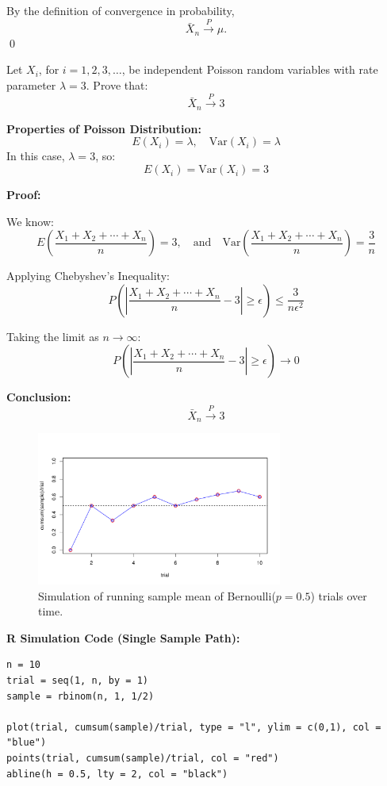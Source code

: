 By the definition of convergence in probability,
\[
\bar{X}_n \xrightarrow{P} \mu.
\]
\qed
\begin{example}

Let \( X_i \), for \( i = 1, 2, 3, \ldots \), be independent Poisson random variables with rate parameter \( \lambda = 3 \). Prove that:
\[
\bar{X}_n \xrightarrow{P} 3
\]

\textbf{Properties of Poisson Distribution:}
\[
E(X_i) = \lambda, \quad \mathrm{Var}(X_i) = \lambda
\]
In this case, \( \lambda = 3 \), so:
\[
E(X_i) = \mathrm{Var}(X_i) = 3
\]

\textbf{Proof:}

We know:
\[
E\left( \frac{X_1 + X_2 + \cdots + X_n}{n} \right) = 3, \quad \text{and} \quad
\mathrm{Var}\left( \frac{X_1 + X_2 + \cdots + X_n}{n} \right) = \frac{3}{n}
\]

Applying Chebyshev’s Inequality:
\[
P\left( \left| \frac{X_1 + X_2 + \cdots + X_n}{n} - 3 \right| \geq \epsilon \right) \leq \frac{3}{n \epsilon^2}
\]

Taking the limit as \( n \to \infty \):
\[
P\left( \left| \frac{X_1 + X_2 + \cdots + X_n}{n} - 3 \right| \geq \epsilon \right) \to 0
\]

\textbf{Conclusion:}
\[
\bar{X}_n \xrightarrow{P} 3
\]
\end{example}
\begin{figure}[H]
  \centering
  \includegraphics[width=0.72\textwidth]{Section5/images/simulation_plot.pdf}
  \caption{Simulation of running sample mean of Bernoulli(\(p = 0.5\)) trials over time.}
\end{figure}

\noindent\textbf{R Simulation Code (Single Sample Path):}
\begin{tcolorbox}[
    colback=gray!10,
    colframe=black!45,
    arc=2mm,
    enhanced,
    breakable,
    width=\textwidth,
    boxsep=0pt,
    left=4pt,    %
    right=8pt,   %
    top=2pt,
    bottom=2pt
]
\begin{verbatim}
n = 10
trial = seq(1, n, by = 1)
sample = rbinom(n, 1, 1/2)

plot(trial, cumsum(sample)/trial, type = "l", ylim = c(0,1), col = "blue")
points(trial, cumsum(sample)/trial, col = "red")
abline(h = 0.5, lty = 2, col = "black")
\end{verbatim}
\end{tcolorbox}

